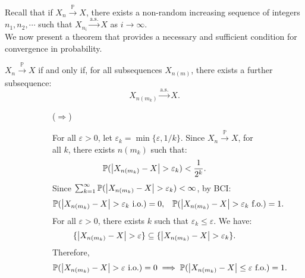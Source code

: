 \documentclass{huhtakm-template-book-v2}
\newcommand{\prob}{\mathbb{P}}
\begin{document}
    Recall that if $X_{n} \xrightarrow{\prob} X$, there exists a non-random increasing sequence of integers $n_{1},n_{2},\cdots$ such that $X_{n_{i}} \xrightarrow{\text{a.s.}} X$ as $i \to \infty$.\\
    We now present a theorem that provides a necessary and sufficient condition for convergence in probability.
    \begin{thm}
        $X_{n} \xrightarrow{\prob} X$ if and only if, for all subsequences $X_{n(m)}$, there exists a further subsequence:
        \begin{equation*}
            X_{n(m_{k})} \xrightarrow{\text{a.s.}} X.
        \end{equation*}
    \end{thm}
    \begin{proofing}
        \begin{figure}[h!]
            \begin{subfigure}[b]{0.05\textwidth}
                ($\Longrightarrow$)
            \end{subfigure}
            \begin{subfigure}[t]{0.9\textwidth}
                For all $\varepsilon > 0$, let $\varepsilon_{k} = \min\{\varepsilon,1/k\}$. Since $X_{n} \xrightarrow{\prob} X$, for all $k$, there exists $n(m_{k})$ such that:
                \begin{equation*}
                    \prob(\abs{X_{n(m_{k})}-X} > \varepsilon_{k}) < \frac{1}{2^{k}}.
                \end{equation*}
                Since $\sum_{k = 1}^{\infty}\prob(\abs{X_{n(m_{k})}-X} > \varepsilon_{k}) < \infty$, by BCI:
                \begin{align*}
                    \prob(\abs{X_{n(m_{k})}-X} > \varepsilon_{k}\text{ i.o.}) &= 0, & \prob(\abs{X_{n(m_{k})}-X} > \varepsilon_{k}\text{ f.o.}) &= 1.
                \end{align*}
                For all $\varepsilon > 0$, there exists $k$ such that $\varepsilon_{k} \leq \varepsilon$. We have:
                \begin{equation*}
                    \{\left|{X_{n(m_{k})}-X}\right| > \varepsilon\}\subseteq\{\left|{X_{n(m_{k})}-X}\right| > \varepsilon_{k}\}.
                \end{equation*}
                Therefore,
                \begin{equation*}
                    \prob(\abs{X_{n(m_{k})}-X} > \varepsilon\text{ i.o.}) = 0 \implies \prob(\abs{X_{n(m_{k})}-X} \leq \varepsilon\text{ f.o.}) = 1.

\end{equation*}
\end{subfigure}
\end{figure}
\end{proofing}
\end{document}

